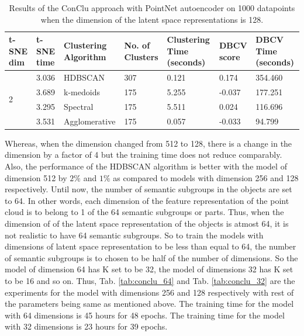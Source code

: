 \begin{table}[H]
  \setlength\extrarowheight{10pt}
  \caption{Results of the ConClu approach with PointNet autoencoder on 1000 datapoints when the dimension of the latent space representations is 128. }
  \centering
  \begin{tabular}{|p{30pt}|p{50pt}|p{60pt}|p{50pt}|p{50pt}|p{50pt}|p{40pt}|}
    \toprule
    \ac{t-SNE} dim	& \ac{t-SNE} time & Clustering Algorithm & No. of Clusters & Clustering Time (seconds) & \ac{DBCV} score & \ac{DBCV} Time (seconds)\\
    \midrule
    \multirow{4}{30pt}{2}	& 3.036 & \ac{HDBSCAN}	& 307	& 0.121 & 0.174	& 354.460 \\ \cline{2-7} 
    & 3.689 & k-medoids	& 175	& 5.255 & -0.037	& 177.251 \\ \cline{2-7} 
    & 3.295 & Spectral	& 175	& 5.511 & 0.024	& 116.696 \\ \cline{2-7}
    & 3.531 & Agglomerative	& 175	& 0.057 & -0.033	& 94.799 \\ 
    \bottomrule
  \end{tabular}
  \label{tab:conclu_128}
\end{table}

Whereas, when the dimension changed from 512 to 128, there is a change in the dimension by a factor of 4 but the training time does not reduce comparably. Also, the performance of the \ac{HDBSCAN} algorithm is better with the model of dimension 512 by $2\%$ and $1\%$ as compared to models with dimension 256 and 128 respectively. Until now, the number of semantic subgroups in the objects are set to 64. In other words, each dimension of the feature representation of the point cloud is to belong to 1 of the 64 semantic subgroups or parts. Thus, when the dimension of of the latent space representation of the objects is atmost 64, it is not realistic to have 64 semantic subgroups. So to train the models with dimensions of latent space representation to be less than equal to 64, the number of semantic subgroups is to chosen to be half of the number of dimensions. So the model of dimension 64 has K set to be 32, the model of dimensions 32 has K set to be 16 and so on. 
Thus, Tab. \ref{tab:conclu_64} and Tab. \ref{tab:conclu_32} are the experiments for the model with dimensions 256 and 128 respectively with rest of the parameters being same as mentioned above. The training time for the model with 64 dimensions is 45 hours for 48 epochs. The training time for the model with 32 dimensions is 23 hours for 39 epochs.

